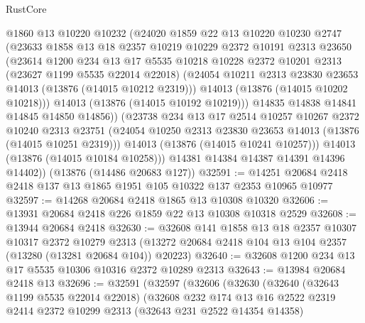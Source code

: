 \begin{lexlean}{RustCore}
\begin{coremodule}
            @1860
            @13
            @10220
            @10232
            (@24020
              @1859
              @22
              @13
              @10220
              @10230
              @2747
              (@23633
                @1858
                @13
                @18
                @2357
                @10219
                @10229
                @2372
                @10191
                @2313
                @23650
                (@23614
                  @1200
                  @234
                  @13
                  @17
                  @5535
                  @10218
                  @10228
                  @2372
                  @10201
                  @2313
                  (@23627 @1199 @5535 @22014 @22018)
                  (@24054 @10211 @2313 @23830 @23653 @14013 (@13876 (@14015 @10212 @2319)))
                  @14013
                  (@13876 (@14015 @10202 @10218)))
                @14013
                (@13876 (@14015 @10192 @10219)))
              @14835
              @14838
              @14841
              @14845
              @14850
              @14856))
          (@23738
            @234
            @13
            @17
            @2514
            @10257
            @10267
            @2372
            @10240
            @2313
            @23751
            (@24054 @10250 @2313 @23830 @23653 @14013 (@13876 (@14015 @10251 @2319)))
            @14013
            (@13876 (@14015 @10241 @10257)))
          @14013
          (@13876 (@14015 @10184 @10258)))
        @14381
        @14384
        @14387
        @14391
        @14396
        @14402))
    (@13876 (@14486 @20683 @127))
@32591 := @14251 @20684 @2418 @2418 @137 @13 @1865 @1951 @105 @10322 @137 @2353 @10965 @10977
@32597 := @14268 @20684 @2418 @1865 @13 @10308 @10320
@32606 := @13931 @20684 @2418 @226 @1859 @22 @13 @10308 @10318 @2529
@32608 := @13944 @20684 @2418
@32630 := @32608
    @141
    @1858
    @13
    @18
    @2357
    @10307
    @10317
    @2372
    @10279
    @2313
    (@13272 @20684 @2418 @104 @13 @104 @2357 (@13280 (@13281 @20684 @104)) @20223)
@32640 := @32608 @1200 @234 @13 @17 @5535 @10306 @10316 @2372 @10289 @2313
@32643 := @13984 @20684 @2418 @13
@32696 := @32591
    (@32597
      (@32606
        (@32630
          (@32640
            (@32643 @1199 @5535 @22014 @22018)
            (@32608
              @232
              @174
              @13
              @16
              @2522
              @2319
              @2414
              @2372
              @10299
              @2313
              (@32643 @231 @2522 @14354 @14358)

\end{coremodule}
\end{lexlean}
